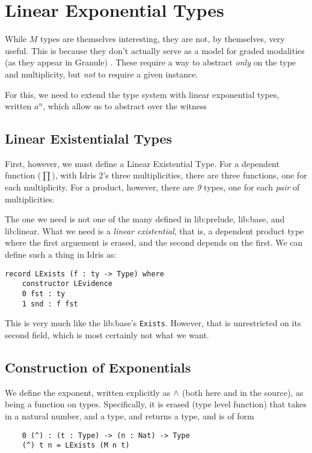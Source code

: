 \section{Linear Exponential Types}
\label{sec:num}

While $M$ types are themselves interesting, they are not, by themselves, very useful.
This is because they don't actually serve as a model for graded modalities (as they appear in Granule) \cite{granule}.
These require a way to abstract \emph{only} on the type and multiplicity, but \emph{not} to require a given instance.

For this, we need to extend the type system with linear exponential types, written $a^n$, which allow us to abstract over the witness

\subsection{Linear Existentialal Types}

First, however, we must define a Linear Existential Type. 
For a dependent function ($\prod$), with Idris 2's three multiplicities, there are three functions, one for each multiplicity.
For a product, however, there are \emph{9} types, one for each \emph{pair} of multiplicities. 

The one we need is not one of the many defined in \gls{lib:prelude}, \gls{lib:base}, and \gls{lib:linear}.
What we need is a \emph{linear existential}, that is, a dependent product type where the first arguement is erased, and the second depends on the first. 
We can define such a thing in Idris as:

\begin{verbatim}
record LExists (f : ty -> Type) where
	constructor LEvidence
	0 fst : ty 
	1 snd : f fst
\end{verbatim}

This is very much like the \gls{lib:base}'s \verb|Exists|. 
However, that is unrestricted on its second field, which is most certainly not what we want.
 
\subsection{Construction of Exponentials}

We define the exponent, written explicitly as $\wedge$ (both here and in the source), as being a function on types. 
Specifically, it is erased (type level function) that takes in a natural number, and a type, and returns a type, and is of form 
\begin{verbatim}
	0 (^) : (t : Type) -> (n : Nat) -> Type
	(^) t n = LExists (M n t)
\end{verbatim}

